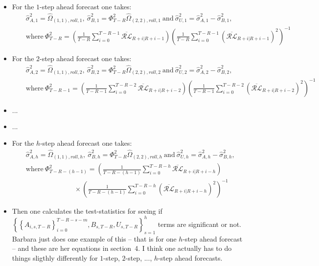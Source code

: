 \documentclass[11pt]{article}
\begin{document}
\begin{itemize}
\item For the $1$-step ahead forecast one takes:
\begin{eqnarray}&&\!\!\!\!\widehat{\sigma}^{2}_{A,1}=\widehat{\Omega}_{(1,1),roll,1},\ \widehat{\sigma}^{2}_{B,1}=\Phi^{2}_{T-R}\widehat{\Omega}_{(2,2),roll,1}\ \mathrm{and} \ \widehat{\sigma}^{2}_{U,1}=\widehat{\sigma}^{2}_{A,1}-\widehat{\sigma}^{2}_{B,1}, \nonumber \\
&&\!\!\!\!\mathrm{where}\ \Phi^{2}_{T-R}=\left(\frac{1}{T-R}\sum_{i=0}^{T-R-1} \overline{\mathcal{RL}}_{R+i|R+i-1}\right) \left(\frac{1}{T-R}\sum_{i=0}^{T-R-1} \left(\overline{\mathcal{RL}}_{R+i|R+i-1}\right)^{2}\right)^{-1} \nonumber
\end{eqnarray}
\item For the $2$-step ahead forecast one takes:
\begin{eqnarray}&&\!\!\!\!\widehat{\sigma}^{2}_{A,2}=\widehat{\Omega}_{(1,1),roll,2},\ \widehat{\sigma}^{2}_{B,2}=\Phi^{2}_{T-R}\widehat{\Omega}_{(2,2),roll,2}\ \mathrm{and} \ \widehat{\sigma}^{2}_{U,2}=\widehat{\sigma}^{2}_{A,2}-\widehat{\sigma}^{2}_{B,2}, \nonumber \\
&&\!\!\!\!\mathrm{where}\ \Phi^{2}_{T-R-1}=\left(\frac{1}{T\!-\!R\!-\!1}\sum_{i=0}^{T-R-2} \overline{\mathcal{RL}}_{R+i|R+i-2}\right) \left(\frac{1}{T\!-\!R\!-\!1}\sum_{i=0}^{T-R-2} \left(\overline{\mathcal{RL}}_{R+i|R+i-2}\right)^{2}\right)^{-1} \nonumber
\end{eqnarray}
\item ...
\item ...
\item For the $h$-step ahead forecast one takes:
\begin{eqnarray}&&\!\!\!\!\widehat{\sigma}^{2}_{A,h}=\widehat{\Omega}_{(1,1),roll,h},\ \widehat{\sigma}^{2}_{B,h}=\Phi^{2}_{T-R}\widehat{\Omega}_{(2,2),roll,h}\ \mathrm{and} \ \widehat{\sigma}^{2}_{U,h}=\widehat{\sigma}^{2}_{A,h}-\widehat{\sigma}^{2}_{B,h}, \nonumber \\
&&\!\!\!\!\mathrm{where}\ \Phi^{2}_{T-R-(h-1)}=\left(\frac{1}{T\!-\!R\!-\!(h\!-\!1)}\sum_{i=0}^{T-R-h} \overline{\mathcal{RL}}_{R+i|R+i-h}\right) \nonumber \\ && \ \ \ \   \ \ \ \   \ \ \ \   \ \ \ \   \ \ \ \   \ \ \ \   \ \ \ \   \ \ \ \   \times\left(\frac{1}{T\!-\!R\!-\!(h\!-\!1)}\sum_{i=0}^{T-R-h}\left (\overline{\mathcal{RL}}_{R+i|R+i-h}\right)^{2}\right)^{-1} \ \ \ \   \ \ \ \    \ \ \ \   \nonumber
\end{eqnarray}
\item Then one calculates the test-statistics for seeing if $\left\{\left\{A_{i,s,T-R}\right\}_{i=0}^{T-R-s-m},B_{s,T-R},U_{s,T-R}\right\}_{s=1}^{h}$ terms are significant or not.  Barbara just does one example of this -- that is for one $h$-step ahead forecast -- and these are her equations in section~4.  I think one actually has to do things sligthly differently for $1$-step, $2$-step, ..., $h$-step ahead forecasts.

\end{itemize}
\end{document}
